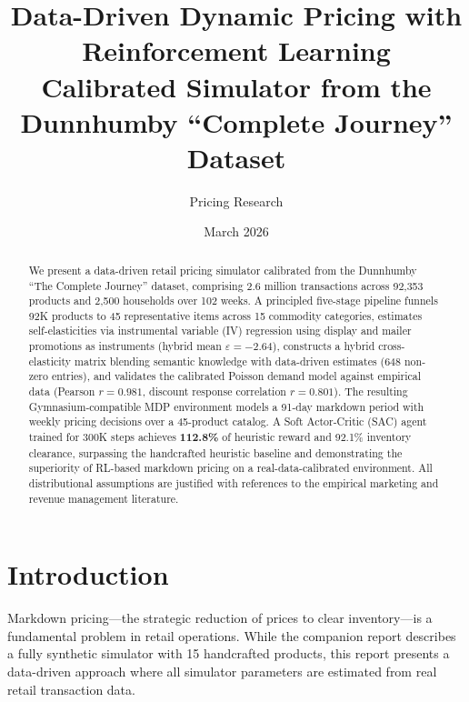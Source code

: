 \documentclass[11pt,a4paper]{article}
\title{%
    \textbf{Data-Driven Dynamic Pricing with Reinforcement Learning}\\[6pt]
    \large Calibrated Simulator from the Dunnhumby ``Complete Journey'' Dataset
}
\author{Pricing Research}
\date{March 2026}
\begin{document}
\maketitle

\begin{abstract}
We present a data-driven retail pricing simulator calibrated from the Dunnhumby ``The Complete Journey'' dataset, comprising 2.6 million transactions across 92,353 products and 2,500 households over 102 weeks.
A principled five-stage pipeline funnels 92K products to 45 representative items across 15 commodity categories, estimates self-elasticities via instrumental variable (IV) regression using display and mailer promotions as instruments (hybrid mean $\varepsilon = -2.64$), constructs a hybrid cross-elasticity matrix blending semantic knowledge with data-driven estimates (648 non-zero entries), and validates the calibrated Poisson demand model against empirical data (Pearson $r = 0.981$, discount response correlation $r = 0.801$).
The resulting Gymnasium-compatible MDP environment models a 91-day markdown period with weekly pricing decisions over a 45-product catalog.
A Soft Actor-Critic (SAC) agent trained for 300K steps achieves \textbf{112.8\%} of heuristic reward and 92.1\% inventory clearance, surpassing the handcrafted heuristic baseline and demonstrating the superiority of RL-based markdown pricing on a real-data-calibrated environment.
All distributional assumptions are justified with references to the empirical marketing and revenue management literature.
\end{abstract}

\tableofcontents
\newpage

\section{Introduction}

Markdown pricing---the strategic reduction of prices to clear inventory---is a fundamental problem in retail operations.
While the companion report describes a fully synthetic simulator with 15 handcrafted products, this report presents a data-driven approach where all simulator parameters are estimated from real retail transaction data.
\end{document}
